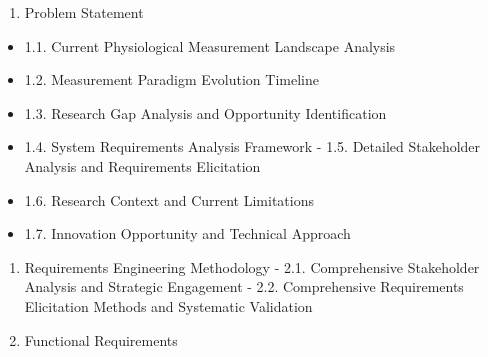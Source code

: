 \documentclass[12pt,a4paper]{report}
\begin{document}
\begin{enumerate}
\item Problem Statement
\end{enumerate}
\begin{itemize}
\item 1.1. Current Physiological Measurement Landscape Analysis
\item 1.2. Measurement Paradigm Evolution Timeline
\item 1.3. Research Gap Analysis and Opportunity Identification
\item 1.4. System Requirements Analysis Framework
    -
    1.5. Detailed Stakeholder Analysis and Requirements Elicitation
\item 1.6. Research Context and Current Limitations
\item 1.7. Innovation Opportunity and Technical Approach
\end{itemize}
\begin{enumerate}
\item Requirements Engineering Methodology
    -
    2.1. Comprehensive Stakeholder Analysis and Strategic Engagement
    -
    2.2. Comprehensive Requirements Elicitation Methods and Systematic Validation
\item Functional Requirements
\end{enumerate}
\end{document}
